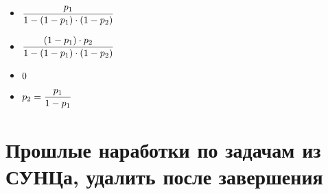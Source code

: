 \documentclass{article}
\begin{document}
\begin{enumerate}
    \answer{}
    \begin{itemize}
        \item $\displaystyle{ \frac{p_1}{1 - (1 - p_1)\cdot(1 - p_2)}}$
        \item $\displaystyle{ \frac{(1 - p_1) \cdot p_2}{1 - (1 - p_1) \cdot (1 - p_2)}}$
        \item $\displaystyle{0}$
        \item $\displaystyle{ p_2 = \frac{p_1}{1 - p_1}}$
    \end{itemize}
    
\end{enumerate}

\section*{Прошлые наработки по задачам из СУНЦа, удалить после завершения}
























 
	
\end{document}
